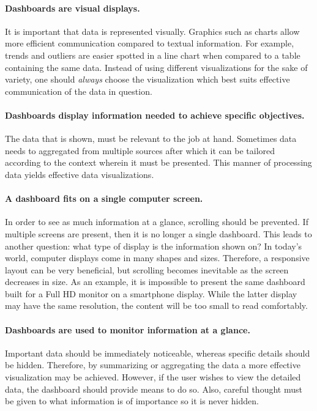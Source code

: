         \paragraph{Dashboards are visual displays.} It is important that data is represented visually. Graphics such as charts allow more efficient communication compared to textual information. For example, trends and outliers are easier spotted in a line chart when compared to a table containing the same data. Instead of using different visualizations for the sake of variety, one should \emph{always} choose the visualization which best suits effective communication of the data in question\cite{Few2005}.

        \paragraph{Dashboards display information needed to achieve specific objectives.} The data that is shown, must be relevant to the job at hand. Sometimes data needs to aggregated from multiple sources after which it can be tailored according to the context wherein it must be presented. This manner of processing data yields effective data visualizations.

        \paragraph{A dashboard fits on a single computer screen.} In order to see as much information at a glance, scrolling should be prevented. If multiple screens are present, then it is no longer a single dashboard. This leads to another question: what type of display is the information shown on? In today's world, computer displays come in many shapes and sizes. Therefore, a responsive layout can be very beneficial, but scrolling becomes inevitable as the screen decreases in size. As an example, it is impossible to present the same dashboard built for a Full HD monitor on a smartphone display. While the latter display may have the same resolution, the content will be too small to read comfortably.

        \paragraph{Dashboards are used to monitor information at a glance.} Important data should be immediately noticeable, whereas specific details should be hidden. Therefore, by summarizing or aggregating the data a more effective visualization may be achieved. However, if the user wishes to view the detailed data, the dashboard should provide means to do so. Also, careful thought must be given to what information is of importance so it is never hidden.\bigskip

